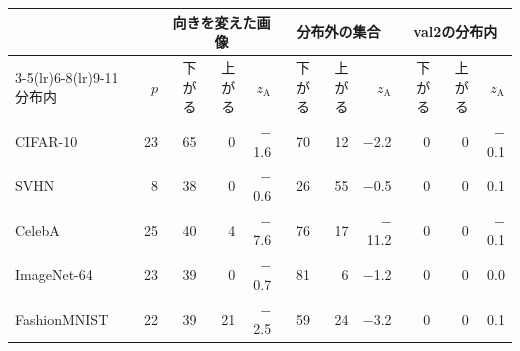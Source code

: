 \documentclass[border=3pt]{standalone}
\begin{document}
%
\begin{tabular}{lrrrrrrrrrr}%
\toprule
 & & \multicolumn{3}{c}{向きを変えた画像} & \multicolumn{3}{c}{分布外の集合} & \multicolumn{3}{c}{val2の分布内}\\
\cmidrule(lr){3-5}\cmidrule(lr){6-8}\cmidrule(lr){9-11}
分布内 & $p$ & 下がる & 上がる & $z_{\mathrm{A}}$ & 下がる & 上がる & $z_{\mathrm{A}}$ & 下がる & 上がる & $z_{\mathrm{A}}$\\
\midrule
CIFAR-10 & 23 & 65 & 0 & $-$1.6 & 70 & 12 & $-$2.2 & 0 & 0 & $-$0.1\\
SVHN & 8 & 38 & 0 & $-$0.6 & 26 & 55 & $-$0.5 & 0 & 0 & 0.1\\
CelebA & 25 & 40 & 4 & $-$7.6 & 76 & 17 & $-$11.2 & 0 & 0 & $-$0.1\\
ImageNet-64 & 23 & 39 & 0 & $-$0.7 & 81 & 6 & $-$1.2 & 0 & 0 & 0.0\\
FashionMNIST & 22 & 39 & 21 & $-$2.5 & 59 & 24 & $-$3.2 & 0 & 0 & 0.1\\
\bottomrule
\end{tabular}%
\end{document}
